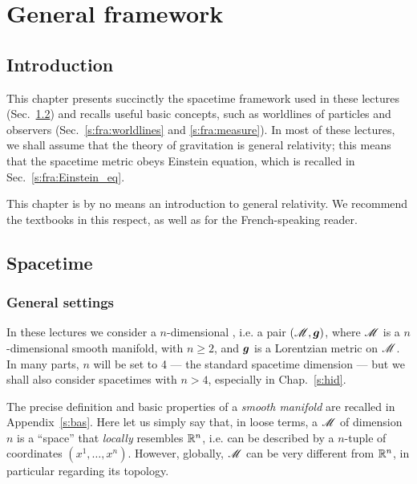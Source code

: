\chapter{General framework} \label{s:fra}

\minitoc

\section{Introduction}

This chapter presents succinctly the spacetime framework used in these lectures
(Sec.~\ref{s:fra:spacetime})
and recalls useful basic concepts, such as worldlines of particles and observers
(Sec.~\ref{s:fra:worldlines} and \ref{s:fra:measure}).
In most of these lectures, we shall assume that the theory of gravitation is general
relativity; this means that the spacetime metric obeys Einstein equation,
which is recalled in Sec.~\ref{s:fra:Einstein_eq}.

This chapter is by no means an introduction to general relativity. We
recommend the textbooks \cite{Carro04,Choqu15,Hartl03,MisneTW73,Strau04,Wald84} in this
respect, as well as \cite{DerueU14,Gourg14,Langl13} for the French-speaking reader.

\section{Spacetime} \label{s:fra:spacetime}

\subsection{General settings}

In these lectures we consider a $n$-dimensional ,
i.e. a pair $(\mathscr{M}, \bm{g})$, where $\mathscr{M}$ is a $n$-dimensional smooth manifold, with $n\geq 2$, and $\bm{g}$ is a Lorentzian metric on $\mathscr{M}$. In many parts, $n$ will be set to 4
--- the standard spacetime dimension --- but we shall also consider spacetimes with
$n>4$, especially in Chap.~\ref{s:hid}.

The precise definition and basic properties of a \emph{smooth manifold} are recalled
in Appendix~\ref{s:bas}. Here let us simply say that, in loose terms,
a  $\mathscr{M}$ of dimension $n$ is a ``space'' that \emph{locally} resembles $\mathbb{R}^n$,
i.e. can be described by a $n$-tuple of coordinates $(x^1,\ldots,x^n)$. However, globally,
$\mathscr{M}$ can be very different from $\mathbb{R}^n$, in particular regarding its topology.

